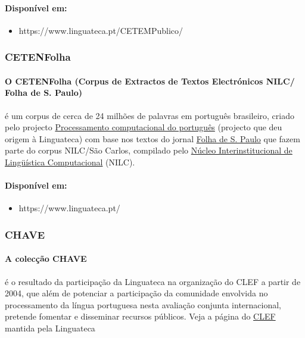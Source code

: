 \documentclass[a4paper, 10pt]{article}
\begin{document}
            	\paragraph{Disponível em:}
            	\begin{itemize}
				    \item https://www.linguateca.pt/CETEMPublico/

			    \end{itemize}
            \subsubsection{CETENFolha}
            	\paragraph{O CETENFolha (Corpus de Extractos de Textos Electrónicos NILC/
            	Folha de S. Paulo)}é um corpus de cerca de 24 milhões de palavras em português brasileiro, criado pelo projecto \href{https://www.linguateca.pt/proc_comp_port.html}{Processamento computacional do português} (projecto que deu origem à Linguateca) com base nos textos do jornal \href{https://www.folha.uol.com.br/}{Folha de S. Paulo} que fazem parte do corpus NILC/São Carlos, compilado pelo \href{http://www.nilc.icmsc.sc.usp.br/}{Núcleo Interinstitucional de Lingüística Computacional} (NILC).
                \paragraph{Disponível em:}
            	\begin{itemize}
				    \item https://www.linguateca.pt/

			    \end{itemize}
            \subsubsection{CHAVE}
            	\paragraph{A colecção CHAVE} é o resultado da participação da Linguateca na organização do CLEF a partir de 2004, que além de potenciar a participação da comunidade envolvida no processamento da língua portuguesa nesta avaliação conjunta internacional, pretende fomentar e disseminar recursos públicos. Veja a página do \href{https://www.linguateca.pt/CLEF/}{CLEF} mantida pela Linguateca
\end{document}
